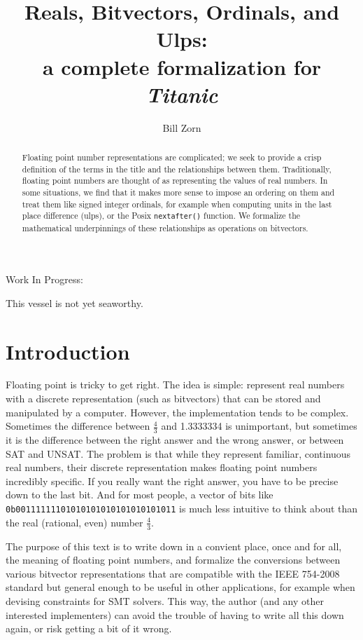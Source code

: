\documentclass[letterpaper,10pt]{article}
\title{Reals, Bitvectors, Ordinals, and Ulps:\\a complete formalization for \emph{Titanic}}
\author{Bill Zorn}
\begin{document}
\maketitle

\begin{abstract}
 Floating point number representations are complicated; we seek to provide a crisp definition of the terms in the title and the relationships between them. Traditionally, floating point numbers are thought of as representing the values of real numbers. In some situations, we find that it makes more sense to impose an ordering on them and treat them like signed integer ordinals, for example when computing units in the last place difference (ulps), or the Posix \texttt{nextafter()} function. We formalize the mathematical underpinnings of these relationships as operations on bitvectors.
\end{abstract}

\begin{center}
 \huge \color{red} Work In Progress:

\large This vessel is not yet seaworthy.
\normalsize \normalcolor
\end{center}

\section{Introduction}

Floating point is tricky to get right. The idea is simple: represent real numbers with a discrete representation (such as bitvectors) that can be stored and manipulated by a computer. However, the implementation tends to be complex. Sometimes the difference between $\frac{4}{3}$ and 1.3333334 is unimportant, but sometimes it is the difference between the right answer and the wrong answer, or between SAT and UNSAT. The problem is that while they represent familiar, continuous real numbers, their discrete representation makes floating point numbers incredibly specific. If you really want the right answer, you have to be precise down to the last bit. And for most people, a vector of bits like \texttt{0b00111111101010101010101010101011} is much less intuitive to think about than the real (rational, even) number $\frac{4}{3}$.

The purpose of this text is to write down in a convient place, once and for all, the meaning of floating point numbers, and formalize the conversions between various bitvector representations that are compatible with the IEEE 754-2008 standard \cite{ieee754-2008} but general enough to be useful in other applications, for example when devising constraints for SMT solvers. This way, the author (and any other interested implementers) can avoid the trouble of having to write all this down again, or risk getting a bit of it wrong.
\end{document}
